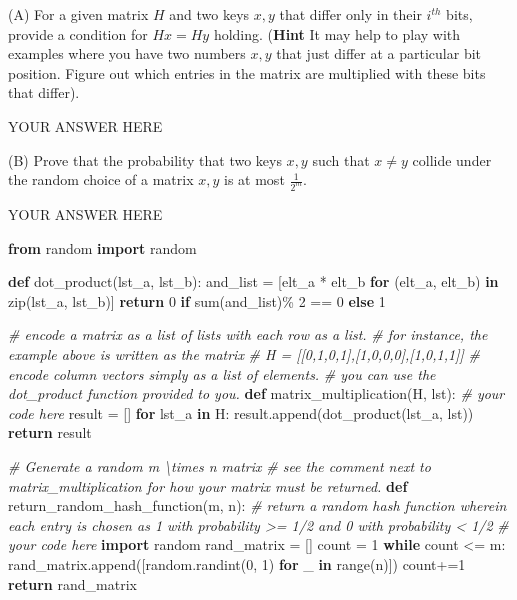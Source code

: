 \documentclass[
]{article}
\newenvironment{Shaded}{}{}
\newcommand{\BuiltInTok}[1]{\textcolor[rgb]{0.00,0.50,0.00}{#1}}
\newcommand{\CommentTok}[1]{\textcolor[rgb]{0.38,0.63,0.69}{\textit{#1}}}
\newcommand{\ControlFlowTok}[1]{\textcolor[rgb]{0.00,0.44,0.13}{\textbf{#1}}}
\newcommand{\DecValTok}[1]{\textcolor[rgb]{0.25,0.63,0.44}{#1}}
\newcommand{\ImportTok}[1]{\textcolor[rgb]{0.00,0.50,0.00}{\textbf{#1}}}
\newcommand{\KeywordTok}[1]{\textcolor[rgb]{0.00,0.44,0.13}{\textbf{#1}}}
\newcommand{\NormalTok}[1]{#1}
\newcommand{\OperatorTok}[1]{\textcolor[rgb]{0.40,0.40,0.40}{#1}}
\begin{document}
(A) For a given matrix \(H\) and two keys \(x, y\) that differ only in
their \(i^{th}\) bits, provide a condition for \(Hx = Hy\) holding.
(\textbf{Hint} It may help to play with examples where you have two
numbers \(x, y\) that just differ at a particular bit position. Figure
out which entries in the matrix are multiplied with these bits that
differ).

YOUR ANSWER HERE

(B) Prove that the probability that two keys \(x, y\) such that
\(x \not= y\) collide under the random choice of a matrix \(x, y\) is at
most \(\frac{1}{2^m}\).

YOUR ANSWER HERE

\begin{Shaded}
\begin{Highlighting}[]
\ImportTok{from}\NormalTok{ random }\ImportTok{import}\NormalTok{ random}

\KeywordTok{def}\NormalTok{ dot\_product(lst\_a, lst\_b):}
\NormalTok{    and\_list }\OperatorTok{=}\NormalTok{ [elt\_a }\OperatorTok{*}\NormalTok{ elt\_b }\ControlFlowTok{for}\NormalTok{ (elt\_a, elt\_b) }\KeywordTok{in} \BuiltInTok{zip}\NormalTok{(lst\_a, lst\_b)]}
    \ControlFlowTok{return} \DecValTok{0} \ControlFlowTok{if} \BuiltInTok{sum}\NormalTok{(and\_list)}\OperatorTok{\%} \DecValTok{2} \OperatorTok{==} \DecValTok{0} \ControlFlowTok{else} \DecValTok{1}

\CommentTok{\# encode a matrix as a list of lists with each row as a list.}
\CommentTok{\# for instance, the example above is written as the matrix}
\CommentTok{\# H = [[0,1,0,1],[1,0,0,0],[1,0,1,1]]}
\CommentTok{\# encode column vectors simply as a list of elements.}
\CommentTok{\# you can use the dot\_product function provided to you.}
\KeywordTok{def}\NormalTok{ matrix\_multiplication(H, lst):}
    \CommentTok{\# your code here}
\NormalTok{    result }\OperatorTok{=}\NormalTok{ []}
    \ControlFlowTok{for}\NormalTok{ lst\_a }\KeywordTok{in}\NormalTok{ H:}
\NormalTok{      result.append(dot\_product(lst\_a, lst))}
    \ControlFlowTok{return}\NormalTok{ result}


\CommentTok{\# Generate a random m \textbackslash{}times n matrix}
\CommentTok{\# see the comment next to matrix\_multiplication for how your matrix must be returned.}
\KeywordTok{def}\NormalTok{ return\_random\_hash\_function(m, n):}
    \CommentTok{\# return a random hash function wherein each entry is chosen as 1 with probability \textgreater{}= 1/2 and 0 with probability \textless{} 1/2}
    \CommentTok{\# your code here}
    \ImportTok{import}\NormalTok{ random}
\NormalTok{    rand\_matrix }\OperatorTok{=}\NormalTok{ []}
\NormalTok{    count }\OperatorTok{=} \DecValTok{1}
    \ControlFlowTok{while}\NormalTok{ count }\OperatorTok{\textless{}=}\NormalTok{ m:}
\NormalTok{      rand\_matrix.append([random.randint(}\DecValTok{0}\NormalTok{, }\DecValTok{1}\NormalTok{) }\ControlFlowTok{for}\NormalTok{ \_ }\KeywordTok{in} \BuiltInTok{range}\NormalTok{(n)])}
\NormalTok{      count}\OperatorTok{+=}\DecValTok{1}
    \ControlFlowTok{return}\NormalTok{ rand\_matrix}
\end{Highlighting}
\end{Shaded}
\end{document}

